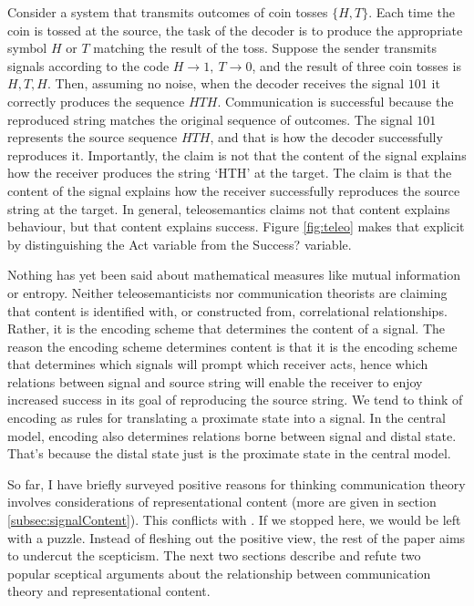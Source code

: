 \documentclass[12pt]{article}
\begin{document}
Consider a system that transmits outcomes of coin tosses $\{H,T\}$.
Each time the coin is tossed at the source, the task of the decoder is to produce the appropriate symbol $H$ or $T$ matching the result of the toss.
Suppose the sender transmits signals according to the code $H\rightarrow1,\ T\rightarrow0$, and the result of three coin tosses is $H, T, H$.
Then, assuming no noise, when the decoder receives the signal $101$ it correctly produces the sequence $HTH$.
Communication is successful because the reproduced string matches the original sequence of outcomes.
The signal $101$ represents the source sequence $HTH$, and that is how the decoder successfully reproduces it.
Importantly, the claim is not that the content of the signal explains how the receiver produces the string `HTH' at the target.
The claim is that the content of the signal explains how the receiver successfully reproduces the source string at the target.
In general, teleosemantics claims not that content explains behaviour, but that content explains success.
Figure \ref{fig:teleo} makes that explicit by distinguishing the Act variable from the Success? variable.

Nothing has yet been said about mathematical measures like mutual information or entropy.
Neither teleosemanticists nor communication theorists are claiming that content is identified with, or constructed from, correlational relationships.
Rather, it is the encoding scheme that determines the content of a signal.
The reason the encoding scheme determines content is that it is the encoding scheme that determines which signals will prompt which receiver acts, hence which relations between signal and source string will enable the receiver to enjoy increased success in its goal of reproducing the source string.
We tend to think of encoding as rules for translating a proximate state into a signal.
In the central model, encoding also determines relations borne between signal and distal state.
That's because the distal state just is the proximate state in the central model.

So far, I have briefly surveyed positive reasons for thinking communication theory involves considerations of representational content (more are given in section \ref{subsec:signalContent}).
This conflicts with \tic{}.
If we stopped here, we would be left with a puzzle.
Instead of fleshing out the positive view, the rest of the paper aims to undercut the scepticism.
The next two sections describe and refute two popular sceptical arguments about the relationship between communication theory and representational content.
\end{document}
